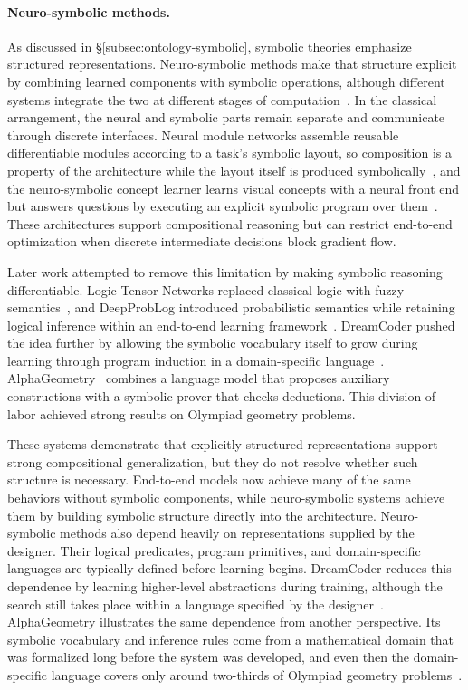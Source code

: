 \documentclass[acmsmall,screen,review,anonymous]{acmart}
\begin{document}
\paragraph{Neuro-symbolic methods.}
As discussed in \S\ref{subsec:ontology-symbolic}, symbolic theories emphasize structured representations.
%
Neuro-symbolic methods make that structure explicit by combining learned components with symbolic operations, although different systems integrate the two at different stages of computation~\citep{garcez2023nesy}.
%
In the classical arrangement, the neural and symbolic parts remain separate and communicate through discrete interfaces.
%
Neural module networks assemble reusable differentiable modules according to a task's symbolic layout, so composition is a property of the architecture while the layout itself is produced symbolically~\citep{Andreas_2016_CVPR}, and the neuro-symbolic concept learner learns visual concepts with a neural front end but answers questions by executing an explicit symbolic program over them~\citep{mao2018the}.
%
These architectures support compositional reasoning but can restrict end-to-end optimization when discrete intermediate decisions block gradient flow.

Later work attempted to remove this limitation by making symbolic reasoning differentiable.
%
Logic Tensor Networks replaced classical logic with fuzzy semantics~\citep{BADREDDINE2022103649nesy}, and DeepProbLog introduced probabilistic semantics while retaining logical inference within an end-to-end learning framework~\citep{manhaeve2018deepproblogneuralprobabilisticlogic}.
%
DreamCoder pushed the idea further by allowing the symbolic vocabulary itself to grow during learning through program induction in a domain-specific language~\citep{ellis2023dream}. 
%
AlphaGeometry~\citep{trinh2024solving} combines a language model that proposes auxiliary constructions with a symbolic prover that checks deductions.
%
This division of labor achieved strong results on Olympiad geometry problems.

These systems demonstrate that explicitly structured representations support strong compositional generalization, but they do not resolve whether such structure is necessary.
%
End-to-end models now achieve many of the same behaviors without symbolic components, while neuro-symbolic systems achieve them by building symbolic structure directly into the architecture.
%
Neuro-symbolic methods also depend heavily on representations supplied by the designer. 
%
Their logical predicates, program primitives, and domain-specific languages are typically defined before learning begins.
%
DreamCoder reduces this dependence by learning higher-level abstractions during training, although the search still takes place within a language specified by the designer~\citep{ellis2023dream}. 
%
AlphaGeometry illustrates the same dependence from another perspective.
%
Its symbolic vocabulary and inference rules come from a mathematical domain that was formalized long before the system was developed, and even then the domain-specific language covers only around two-thirds of Olympiad geometry problems~\citep{trinh2024solving}.
\end{document}
